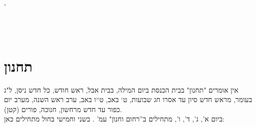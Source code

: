 \documentclass[twoside, openany, parskip=half, 11pt]{book}
\begin{document}
\weekdaysaselichah

\weekdaysageulah

\weekdaysaanneinu

\weekdaysarefuah

\weekdaysaberacha

\enlargethispage{\baselineskip}

\weekdaysashofar

\weekdaysamishpat

\weekdaysaminim

\weekdaysatzadikim

\weekdaysayerushelayim

\weekdaysamalchus

\weekdaysashemakoleinu

\retzeh

\yaalehveyavo

\enlargethispage{\baselineskip}

\zion

\modim

\alhanisim

\weekdaysahodos


\simshalom{\ayt}

\tachanunim

\enlargethispage{\baselineskip}

,
\\
\\
\\
\\






\nextpage


\section[תחנון]{ תחנון }
\label{tachanun mon thurs}
\begin{scriptsize}

\textsf{
אין אומרים "תחנון" בבית הכנסת ביום המילה, בבית אבל, ראש חודש, כל חדש ניסן, ל"ג בעומר, מראש חדש סיון עד אסרו חג שבועות, ט` באב, ט``ו באב, ערב ראש השנה, מערב יום כפור עד חדש מרחשון, חנוכה, פורים (קטן).\\
ביום א', ג', ד', ו', מתחילים ב''רחום וחנון" עמ'
\pageref{nefilas_apayim}.
בשני וחמישי בחול מתחילים כאן:
}

\end{scriptsize}
\end{document}
